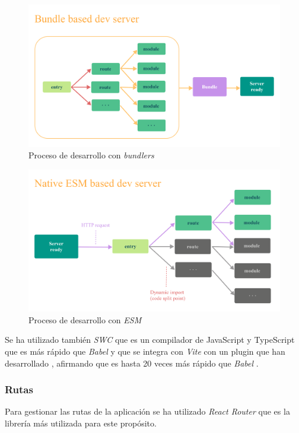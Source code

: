 \begin{figure}[H]
  \centering
  \includegraphics[width=1\textwidth]{img/bundle-based}
  \caption{Proceso de desarrollo con \textit{bundlers} \cite{why-vite}}
  \label{fig:vite-bundle}
\end{figure}

\begin{figure}[H]
  \centering
  \includegraphics[width=1\textwidth]{img/esm-based}
  \caption{Proceso de desarrollo con \textit{ESM} \cite{why-vite}}
  \label{fig:vite-esm}
\end{figure}

Se ha utilizado también \textit{SWC} \cite{swc} que es un compilador de JavaScript y
TypeScript que es más rápido que \textit{Babel} \cite{babel} y que se integra con
\textit{Vite} \cite{vite} con un plugin que han desarrollado \cite{vite-swc}, afirmando
que es hasta 20 veces más rápido que \textit{Babel} \cite{babel}.

\subsubsection{Rutas}
Para gestionar las rutas de la aplicación se ha utilizado \textit{React Router}
\cite{react-router} que es la librería más utilizada para este propósito.

